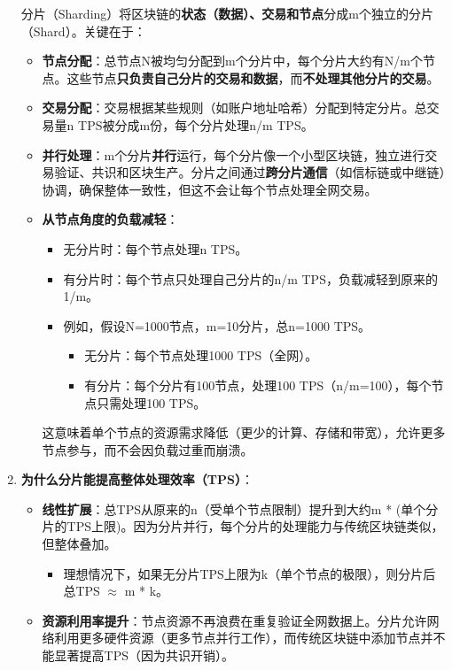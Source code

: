 \documentclass[a4paper,12pt]{ctexart}
\begin{document}
\begin{enumerate}
    分片（Sharding）将区块链的\textbf{状态（数据）、交易和节点}分成m个独立的分片（Shard）。关键在于：
    \begin{itemize}
        \item \textbf{节点分配}：总节点N被均匀分配到m个分片中，每个分片大约有N/m个节点。这些节点\textbf{只负责自己分片的交易和数据}，而\textbf{不处理其他分片的交易}。
        \item \textbf{交易分配}：交易根据某些规则（如账户地址哈希）分配到特定分片。总交易量n TPS被分成m份，每个分片处理n/m TPS。
        \item \textbf{并行处理}：m个分片\textbf{并行}运行，每个分片像一个小型区块链，独立进行交易验证、共识和区块生产。分片之间通过\textbf{跨分片通信}（如信标链或中继链）协调，确保整体一致性，但这不会让每个节点处理全网交易。
        \item \textbf{从节点角度的负载减轻}：
        \begin{itemize}
            \item 无分片时：每个节点处理n TPS。
            \item 有分片时：每个节点只处理自己分片的n/m TPS，负载减轻到原来的1/m。
            \item 例如，假设N=1000节点，m=10分片，总n=1000 TPS。
            \begin{itemize}
                \item 无分片：每个节点处理1000 TPS（全网）。
                \item 有分片：每个分片有100节点，处理100 TPS（n/m=100），每个节点只需处理100 TPS。
            \end{itemize}
        \end{itemize}
        这意味着单个节点的资源需求降低（更少的计算、存储和带宽），允许更多节点参与，而不会因负载过重而崩溃。
    \end{itemize}
    \item \textbf{为什么分片能提高整体处理效率（TPS）}：
    \begin{itemize}
        \item \textbf{线性扩展}：总TPS从原来的n（受单个节点限制）提升到大约m * (单个分片的TPS上限)。因为分片并行，每个分片的处理能力与传统区块链类似，但整体叠加。
        \begin{itemize}
            \item 理想情况下，如果无分片TPS上限为k（单个节点的极限），则分片后总TPS $\approx$ m * k。
        \end{itemize}
        \item \textbf{资源利用率提升}：节点资源不再浪费在重复验证全网数据上。分片允许网络利用更多硬件资源（更多节点并行工作），而传统区块链中添加节点并不能显著提高TPS（因为共识开销）。

\end{itemize}
\end{enumerate}
\end{document}
